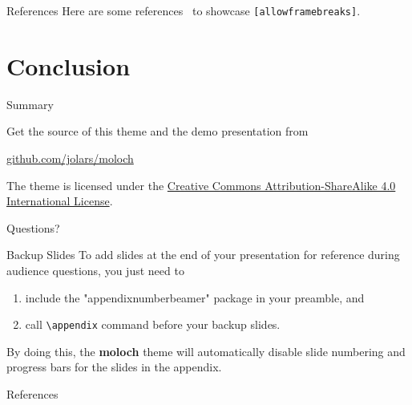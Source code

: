 \documentclass[10pt]{beamer}
\newcommand{\themename}{\textbf{moloch}\xspace}
\begin{document}
\begin{frame}[fragile]{References}
  Here are some references~\cite{Knuth92,ConcreteMath,Simpson,Er01,greenwade93} to showcase \verb+[allowframebreaks]+.
\end{frame}

\section{Conclusion}

\begin{frame}{Summary}

  Get the source of this theme and the demo presentation from
  \begin{center}
    \url{github.com/jolars/moloch}
  \end{center}

  The theme is licensed under the
  \href{http://creativecommons.org/licenses/by-sa/4.0/}{Creative Commons Attribution-ShareAlike 4.0 International License}.

  \begin{center}
    \ccbysa
  \end{center}

\end{frame}

\begin{frame}[standout]
  Questions?
\end{frame}

\appendix

\begin{frame}[fragile]{Backup Slides}
  To add slides at the end of your presentation for reference during audience questions, you just need to
  \begin{enumerate}
    \item include the "appendixnumberbeamer" package in your preamble, and
    \item call \verb+\appendix+ command before your backup slides.
  \end{enumerate}

  By doing this, the \themename theme will automatically disable slide numbering and progress bars for the slides in the appendix.
\end{frame}

\begin{frame}[allowframebreaks]{References}

  
  

\end{frame}
\end{document}
